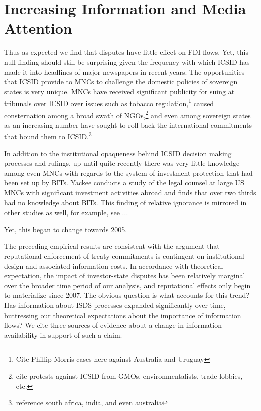 \documentclass[12pt,onesided]{amsart}
\begin{document}
\section*{Increasing Information and Media Attention}

Thus as expected we find that disputes have little effect on FDI flows. Yet, this null finding should still be surprising given the frequency with which ICSID has made it into headlines of major newspapers in recent years. The opportunities that ICSID provide to MNCs to challenge the domestic policies of sovereign states is very unique. MNCs have received significant publicity for suing at tribunals over ICSID over issues such as tobacco regulation,\footnote{Cite Phillip Morris cases here against Australia and Uruguay} caused consternation among a broad swath of NGOs,\footnote{cite protests against ICSID from GMOs, environmentalists, trade lobbies, etc.} and even among sovereign states as an increasing number have sought to roll back the international commitments that bound them to ICSID.\footnote{reference south africa, india, and even australia} 





In addition to the institutional opaqueness behind ICSID decision making processes and rulings, up until quite recently there was very little knowledge among even MNCs with regards to the system of investment protection that had been set up by BITs. Yackee conducts a study of the legal counsel at large US MNCs with significant investment activities abroad and finds that over two thirds had no knowledge about BITs. This finding of relative ignorance is mirrored in other studies as well, for example, see ...

Yet, this began to change towards 2005. 

The preceding empirical results are consistent with the argument that reputational enforcement of treaty commitments is contingent on institutional design and associated information costs. In accordance with theoretical expectation, the impact of investor-state disputes has been relatively marginal over the broader time period of our analysis, and reputational effects only begin to materialize since 2007. The obvious question is what accounts for this trend? Has information about ISDS processes expanded significantly over time, buttressing our theoretical expectations about the importance of information flows? We cite three sources of evidence about a change in information availability in support of such a claim. 
\end{document}
